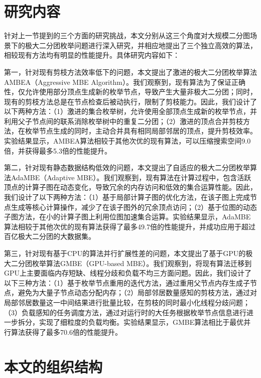 \section{研究内容}



针对上一节提到的三个方面的研究挑战，本文分别从这三个角度对大规模二分图场景下的极大二分团枚举问题进行深入研究，并相应地提出了三个独立高效的算法，相较现有方法均有明显的性能提升。具体研究内容如下：

第一，针对现有剪枝方法效率低下的问题，本文提出了激进的极大二分团枚举算法AMBEA（Aggressive MBE Algorithm）。我们观察到，现有算法为了保证正确性，仅允许使用部分顶点生成新的枚举节点，导致产生大量非极大二分团；同时，现有的剪枝方法总是在节点检查后被动执行，限制了剪枝能力。因此，我们设计了以下两种方法：（1）激进的集合枚举树，允许使用全部顶点生成新的枚举节点，并利用父子节点间的联系消除枚举树中的重复二分团；（2）激进的顶点合并剪枝方法，在枚举节点生成的同时，主动合并具有相同局部邻居的顶点，提升剪枝效率。实验结果显示，AMBEA算法相较于其他次优的现有算法，可以压缩搜索空间9.0倍，并获得最多5.3倍的性能提升。

第二，针对现有静态数据结构低效的问题，本文提出了自适应的极大二分团枚举算法AdaMBE（Adaptive MBE）。我们观察到，现有算法在计算过程中，包含活跃顶点的计算子图在动态变化，导致冗余的内存访问和低效的集合运算性能。因此，我们设计了以下两种方法：（1）基于局部计算子图的优化方法，在该子图上完成节点生成等核心计算操作，减少了在该子图外的冗余顶点访问；（2）基于位图的动态子图方法，在小的计算子图上利用位图加速集合运算。实验结果显示，AdaMBE算法相较于其他次优的现有算法获得了最多49.7倍的性能提升，并成功应用于超过百亿极大二分团的大数据集。

第三，针对现有基于CPU的算法并行扩展性差的问题，本文提出了基于GPU的极大二分团枚举算法GMBE（GPU-based MBE）。我们观察到，将现有算法迁移到GPU上主要面临内存短缺、线程分歧和负载不均三方面问题。因此，我们设计了以下三种方法：（1）基于枚举节点重用的迭代方法，通过重用父节点内存生成子节点，避免为大量子节点动态分配内存；（2）局部邻居数量感知的剪枝方法，通过对局部邻居数量这一中间结果进行批量比较，在剪枝的同时最小化线程分歧问题；（3）负载感知的任务调度方法，通过对运行时的大任务根据枚举节点信息进行进一步拆分，实现了细粒度的负载均衡。实验结果显示，GMBE算法相比于最优并行算法获得了最多70.6倍的性能提升。




\section{本文的组织结构}

